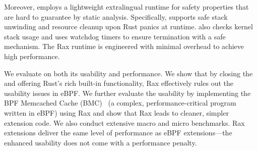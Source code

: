 
Moreover, \projname{} employs a lightweight extralingual runtime for
    safety properties that are hard to guarantee by static analysis.
Specifically, \projname{} supports safe stack unwinding and resource cleanup
    upon Rust panics at runtime.
\projname{} also checks kernel stack usage and uses
    watchdog timers to ensure termination with a safe mechanism.
The Rax runtime is engineered with minimal overhead to achieve
    high performance. %

We evaluate \projname{} on both its usability and performance.
We show that by closing the \gap{} and offering Rust's rich
    built-in functionality, Rax effectively rules out the usability
    issues in eBPF.
We further evaluate the usability by implementing the BPF Memcached Cache (BMC)~\cite{BMC}
    (a complex, performance-critical program written in eBPF)
    using Rax and show that Rax leads to cleaner, simpler extension code.
We also conduct extensive macro and micro benchmarks.
Rax extensions deliver the same level of performance as eBPF extensions---the
    enhanced usability does not come with a performance penalty.



